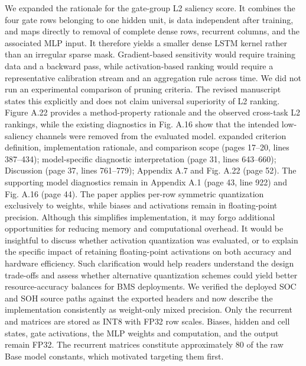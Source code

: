 {} We expanded the rationale for the gate-group L2 saliency score. It combines the four gate rows belonging to one hidden unit, is data independent after training, and maps directly to removal of complete dense rows, recurrent columns, and the associated MLP input. It therefore yields a smaller dense LSTM kernel rather than an irregular sparse mask. Gradient-based sensitivity would require training data and a backward pass, while activation-based ranking would require a representative calibration stream and an aggregation rule across time.\markdownRendererParagraphSeparator
{}We did not run an experimental comparison of pruning criteria. The revised manuscript states this explicitly and does not claim universal superiority of L2 ranking. Figure A.22 provides a method-property rationale and the observed cross-task L2 rankings, while the existing diagnostics in Fig. A.16 show that the intended low-saliency channels were removed from the evaluated model.\markdownRendererParagraphSeparator
{} expanded criterion definition, implementation rationale, and comparison scope (pages 17--20, lines 387--434); model-specific diagnostic interpretation (page 31, lines 643--660); Discussion (page 37, lines 761--779); Appendix A.7 and Fig. A.22 (page 52). The supporting model diagnostics remain in Appendix A.1 (page 43, line 922) and Fig. A.16 (page 44).\markdownRendererInterblockSeparator
{}
\markdownRendererSectionEnd \markdownRendererSectionBegin
{}\markdownRendererInterblockSeparator
{}\markdownRendererBlockQuoteBegin
The paper applies per-row symmetric quantization exclusively to weights, while biases and activations remain in floating-point precision. Although this simplifies implementation, it may forgo additional opportunities for reducing memory and computational overhead. It would be insightful to discuss whether activation quantization was evaluated, or to explain the specific impact of retaining floating-point activations on both accuracy and hardware efficiency. Such clarification would help readers understand the design trade-offs and assess whether alternative quantization schemes could yield better resource-accuracy balances for BMS deployments.\markdownRendererBlockQuoteEnd \markdownRendererInterblockSeparator
{} We verified the deployed SOC and SOH source paths against the exported headers and now describe the implementation consistently as weight-only mixed precision. Only the recurrent  and  matrices are stored as INT8 with FP32 row scales. Biases, hidden and cell states, gate activations, the MLP weights and computation, and the output remain FP32. The recurrent matrices constitute approximately 80\markdownRendererPercentSign{} of the raw Base model constants, which motivated targeting them first.\markdownRendererParagraphSeparator
